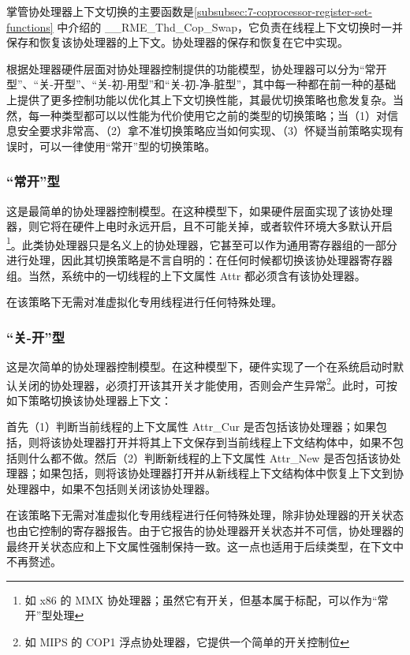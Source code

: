 掌管协处理器上下文切换的主要函数是\ref{subsubsec:7-coprocessor-register-set-functions}
中介绍的 \_\_RME\_Thd\_Cop\_Swap，它负责在线程上下文切换时一并保存和恢复该协处理器的上下文。协处理器的保存和恢复在它中实现。

根据处理器硬件层面对协处理器控制提供的功能模型，协处理器可以分为``常开型''、``关-开型''、``关-初-用型''和``关-初-净-脏型''，其中每一种都在前一种的基础上提供了更多控制功能以优化其上下文切换性能，其最优切换策略也愈发复杂。当然，每一种类型都可以以性能为代价使用它之前的类型的切换策略；当（1）对信息安全要求非常高、（2）拿不准切换策略应当如何实现、（3）怀疑当前策略实现有误时，可以一律使用``常开''型的切换策略。

\subsubsection{``常开''型}\label{subsubsec:9-coproc-always-on}

这是最简单的协处理器控制模型。在这种模型下，如果硬件层面实现了该协处理器，则它将在硬件上电时永远开启，且不可能关掉，或者软件环境大多默认开启\footnote{如 x86 的 MMX 协处理器；虽然它有开关，但基本属于标配，可以作为``常开''型处理}。此类协处理器只是名义上的协处理器，它甚至可以作为通用寄存器组的一部分进行处理，因此其切换策略是不言自明的：在任何时候都切换该协处理器寄存器组。当然，系统中的一切线程的上下文属性 Attr 都必须含有该协处理器。

在该策略下无需对准虚拟化专用线程进行任何特殊处理。

\subsubsection{``关-开''型}\label{subsubsec:9-coproc-on-off}

这是次简单的协处理器控制模型。在这种模型下，硬件实现了一个在系统启动时默认关闭的协处理器，必须打开该其开关才能使用，否则会产生异常\footnote{如 MIPS 的 COP1 浮点协处理器，它提供一个简单的开关控制位}。此时，可按如下策略切换该协处理器上下文：

首先（1）判断当前线程的上下文属性 Attr\_Cur 是否包括该协处理器；如果包括，则将该协处理器打开并将其上下文保存到当前线程上下文结构体中，如果不包括则什么都不做。然后（2）判断新线程的上下文属性 Attr\_New 是否包括该协处理器；如果包括，则将该协处理器打开并从新线程上下文结构体中恢复上下文到协处理器中，如果不包括则关闭该协处理器。

在该策略下无需对准虚拟化专用线程进行任何特殊处理，除非协处理器的开关状态也由它控制的寄存器报告。由于它报告的协处理器开关状态并不可信，协处理器的最终开关状态应和上下文属性强制保持一致。这一点也适用于后续类型，在下文中不再赘述。


